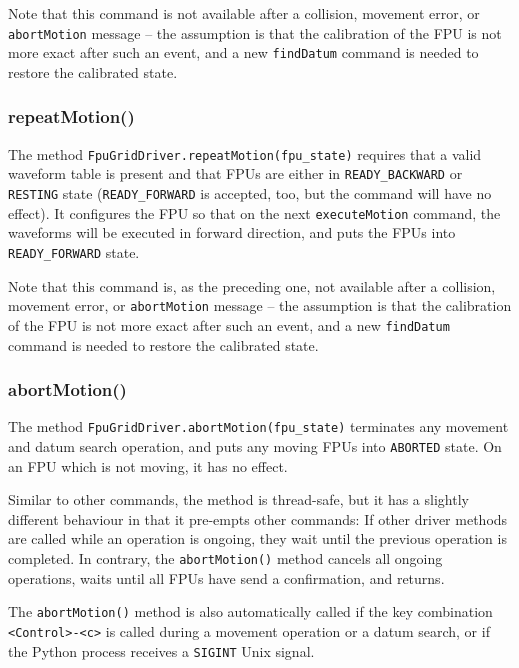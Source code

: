 \documentclass[11pt,a4paper]{report}
\begin{document}
Note that this command is not available after a collision, movement
error, or \texttt{abortMotion} message -- the assumption is that the
calibration of the FPU is not more exact after such an event, and a
new \texttt{findDatum} command is needed to restore the calibrated
state.


\subsubsection{repeatMotion()}

The method \texttt{FpuGridDriver.repeatMotion(fpu\_state)} requires
that a valid waveform table is present and that FPUs are either in
\texttt{READY\_BACKWARD} or \texttt{RESTING} state
(\texttt{READY\_FORWARD} is accepted, too, but the command will have
no effect). It configures the FPU so that on the next
\texttt{executeMotion} command, the waveforms will be executed in
forward direction, and puts the FPUs into \texttt{READY\_FORWARD}
state. 

Note that this command is, as the preceding one, not available after a
collision, movement error, or \texttt{abortMotion} message -- the
assumption is that the calibration of the FPU is not more exact after
such an event, and a new \texttt{findDatum} command is needed to
restore the calibrated state.


\subsubsection{abortMotion()}


The method \texttt{FpuGridDriver.abortMotion(fpu\_state)} terminates
any movement and datum search operation, and puts any moving FPUs
into \texttt{ABORTED} state. On an FPU which is not moving, it has no
effect.

Similar to other commands, the method is thread-safe, but it has a
slightly different behaviour in that it pre-empts other commands: If
other driver methods are called while an operation is ongoing, they
wait until the previous operation is completed. In contrary, the
\texttt{abortMotion()} method cancels all ongoing operations, waits
until all FPUs have send a confirmation, and returns.

The \texttt{abortMotion()} method is also automatically called if the
key combination \verb+<Control>-<c>+ is called during a movement
operation or a datum search, or if the Python process receives a
\texttt{SIGINT} Unix signal.
\end{document}

